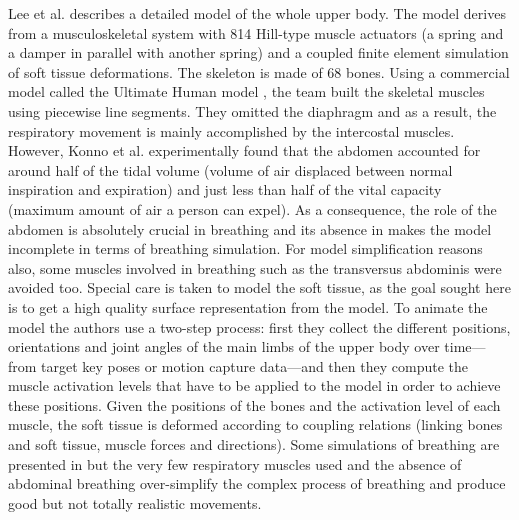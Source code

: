 Lee et al. \cite{lee2009comprehensive, lee2008biomechanical} describes a detailed model of the whole upper body. The model derives from a musculoskeletal system with 814 Hill-type muscle actuators (a spring and a damper in parallel with another spring) and a coupled finite element simulation of soft tissue deformations. The skeleton is made of 68 bones. Using a commercial model called the Ultimate Human model \cite{ultimatemodel2008}, the team built the skeletal muscles using piecewise line segments. They omitted the diaphragm and as a result, the respiratory movement is mainly accomplished by the intercostal muscles. However, Konno et al. \cite{konno1967measurement} experimentally found that the abdomen accounted for around half of the tidal volume (volume of air displaced between normal inspiration and expiration) and just less than half of the vital capacity (maximum amount of air a person can expel). As a consequence, the role of the abdomen is absolutely crucial in breathing and its absence in \cite{lee2009comprehensive, lee2008biomechanical} makes the model incomplete in terms of breathing simulation. For model simplification reasons also, some muscles involved in breathing such as the transversus abdominis were avoided too. Special care is taken to model the soft tissue, as the goal sought here is to get a high quality surface representation from the model. To animate the model the authors use a two-step process: first they collect the different positions, orientations and joint angles of the main limbs of the upper body over time---from target key poses or motion capture data---and then they compute the muscle activation levels that have to be applied to the model in order to achieve these positions. Given the positions of the bones and the activation level of each muscle, the soft tissue is deformed according to coupling relations (linking bones and soft tissue, muscle forces and directions). Some simulations of breathing are presented in \cite{lee2009comprehensive} but the very few respiratory muscles used and the absence of abdominal breathing over-simplify the complex process of breathing and produce good but not totally realistic movements.


